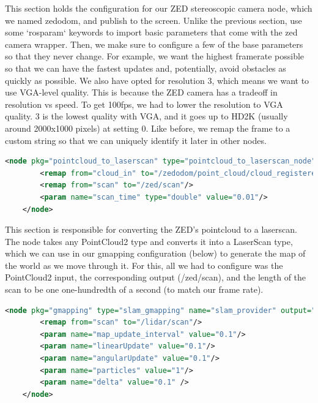 \documentclass[onecolumn, draftclsnofoot, 10pt, compsoc]{IEEEtran}
\begin{document}
This section holds the configuration for our ZED stereoscopic camera node, which we named zedodom, and publish to the screen. Unlike the previous section, use some `rosparam` keywords to import basic parameters that come with the zed camera wrapper. Then, we make sure to configure a few of the base parameters so that they never change. For example, we want the highest framerate possible so that we can have the fastest updates and, potentially, avoid obstacles as quickly as possible. We also have opted for resolution 3, which means we want to use VGA-level quality. This is because the ZED camera has a tradeoff in resolution vs speed. To get 100fps, we had to lower the resolution to VGA quality. 3 is the lowest quality with VGA, and it goes up to HD2K (usually around 2000x1000 pixels) at setting 0. Like before, we remap the frame to a custom string so that we can uniquely identify it later in other nodes.

\begin{lstlisting}[language=XML]
    <node pkg="pointcloud_to_laserscan" type="pointcloud_to_laserscan_node" name="zed_pointcloud_to_laserscan" output="screen">
        <remap from="cloud_in" to="/zedodom/point_cloud/cloud_registered"/>
        <remap from="scan" to="/zed/scan"/>
        <param name="scan_time" type="double" value="0.01"/>
    </node>
\end{lstlisting}

This section is responsible for converting the ZED's pointcloud to a laserscan. The node takes any PointCloud2 type and converts it into a LaserScan type, which we can use in our gmapping configuration (below) to generate the map of the world as we move through it. For this, all we had to configure was the PointCloud2 input, the corresponding output (/zed/scan), and the length of the scan to be one one-hundredth of a second (to match our frame rate).

\begin{lstlisting}[language=XML]
    <node pkg="gmapping" type="slam_gmapping" name="slam_provider" output="screen">
        <remap from="scan" to="/lidar/scan"/>
        <param name="map_update_interval" value="0.1"/>
        <param name="linearUpdate" value="0.1"/>
        <param name="angularUpdate" value="0.1"/>
        <param name="particles" value="1"/>
        <param name="delta" value="0.1" />
    </node>
\end{lstlisting}
\end{document}
